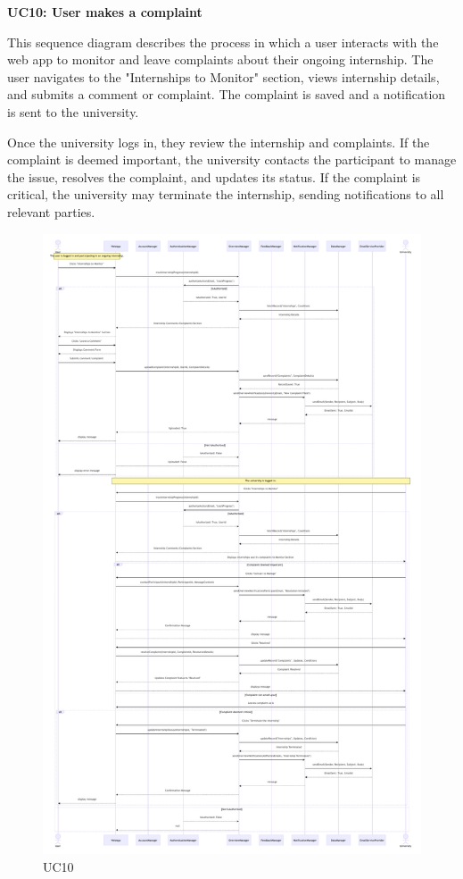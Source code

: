\newpage
\textbf{UC10: User makes a complaint}

This sequence diagram describes the process in which a user interacts with the web app to monitor and leave complaints about their ongoing internship. The user navigates to the "Internships to Monitor" section, views internship details, and submits a comment or complaint. The complaint is saved and a notification is sent to the university.

Once the university logs in, they review the internship and complaints. If the complaint is deemed important, the university contacts the participant to manage the issue, resolves the complaint, and updates its status. If the complaint is critical, the university may terminate the internship, sending notifications to all relevant parties.

\begin{figure}[H]
    \centering
    \includegraphics[width=0.9\linewidth]{DD//Images/SequenceDiagrams/UC10.pdf}
    \caption{UC10}
\end{figure}






